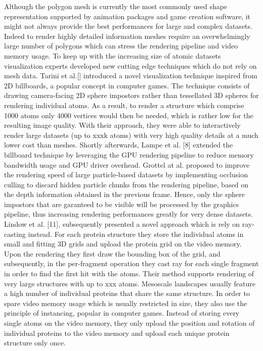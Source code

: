 Although the polygon mesh is currently the most commonly used shape representation supported by animation packages and game creation software, it might not always provide the best performances for large and complex datasets.
Indeed to render highly detailed information meshes require an overwhelmingly large number of polygons which can stress the rendering pipeline and video memory usage.
To keep up with the increasing size of atomic datasets visualization experts developed new cutting edge techniques which do not rely on mesh data.
Tarini et al.[] introduced a novel visualization technique inspired from 2D billboards, a popular concept in computer games.
The technique consists of drawing camera-facing 2D sphere impostors rather than tessellated 3D spheres for rendering individual atoms.
As a result, to render a structure which comprise 1000 atoms only 4000 vertices would then be needed, which is rather low for the resulting image quality.
With their approach, they were able to interactively render large datasets (up to xxxk atoms) with very high quality details at a much lower cost than meshes.
Shortly afterwards, Lampe et al. [8] extended the billboard technique by leveraging the GPU rendering pipeline to reduce memory bandwidth usage and GPU driver overhead. 
Grottel at al. proposed to improve the rendering speed of large particle-based datasets by implementing occlusion culling to discard hidden particle chunks from the rendering pipeline, based on the depth information obtained in the previous frame.
Hence, only the sphere impostors that are garanteed to be visible will be processed by the graphics pipeline, thus increasing rendering performances greatly for very dense datasets.
Lindow et al. [11], subsequently presented a novel approach which is rely on ray-casting instead.
For each protein structure they store the individual atoms in small and fitting 3D grids and upload the protein grid on the video memory.
Upon the rendering they first draw the bounding box of the grid, and subsequently, in the per-fragment operation they cast ray for each single fragment in order to find the first hit with the atoms.
Their method supports rendering of very large structures with up to xxx atoms.
Mesoscale landscapes usually feature a high number of individual proteins that share the same structure.
In order to spare video memory usage which is usually restricted in size, they also use the principle of instancing, popular in computer games.
Instead of storing every single atoms on the video memory, they only upload the position and rotation of individual proteins to the video memory and upload each unique protein structure only once.
